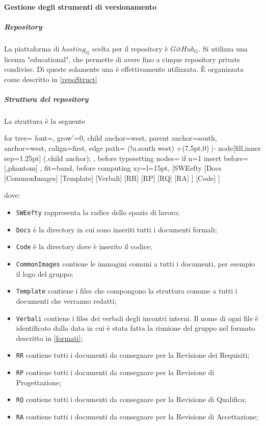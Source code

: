 		\paragraph{Gestione degli strumenti di versionamento}
			\subparagraph{Repository} \Spazio
			La piattaforma di $hosting_G$ scelta per il repository è $GitHub_G$. Si utilizza una licenza "educational", che permette di avere fino a cinque repository private condivise. Di queste solamente una è effettivamente utilizzata. È organizzata come descritto in \ref{repoStruct}
			\subparagraph{Struttura del repository}\Spazio
			\label{repoStruct}
			La struttura è la seguente\\
			\begin{center}
			\begin{forest}
				for tree={
					font=\ttfamily,
					grow'=0,
					child anchor=west,
					parent anchor=south,
					anchor=west,
					calign=first,
					edge path={
						\noexpand{}
						(!u.south west) +(7.5pt,0) |- node[fill,inner sep=1.25pt] {} (.child anchor);
					},
					before typesetting nodes={
						if n=1
						{insert before={[,phantom]}}
						{}
					},
					fit=band,
					before computing xy={l=15pt},
				}
				[SWEefty
					[Docs
						[CommonImages]
						[Template]
						[Verbali]
						[RR]
						[RP]
						[RQ]
						[RA]
					]
					[Code]
				]
			\end{forest}
			\end{center}
			dove:
			\begin{itemize}
				\item \texttt{SWEefty} rappresenta la radice dello spazio di lavoro;
				\item \texttt{Docs} è la directory in cui sono inseriti tutti i documenti formali;
				\item \texttt{Code} è la directory dove è inserito il codice;
				\item \texttt{CommonImages} contiene le immagini comuni a tutti i documenti, per esempio il logo del gruppo;
				\item \texttt{Template} contiene i files che compongono la struttura comune a tutti i documenti che verranno redatti;
				\item \texttt{Verbali} contiene i files dei verbali degli incontri interni. Il nome di ogni file è identificato dalla data in cui è stata fatta la riunione del gruppo nel formato descritto in \ref{formati};
				\item \texttt{RR} contiene tutti i documenti da consegnare per la Revisione dei Requisiti;
				\item \texttt{RP} contiene tutti i documenti da consegnare per la Revisione di Progettazione;
				\item \texttt{RQ} contiene tutti i documenti da consegnare per la Revisione di Qualifica;
				\item \texttt{RA} contiene tutti i documenti da consegnare per la Revisione di Accettazione;	
			\end{itemize}
			
